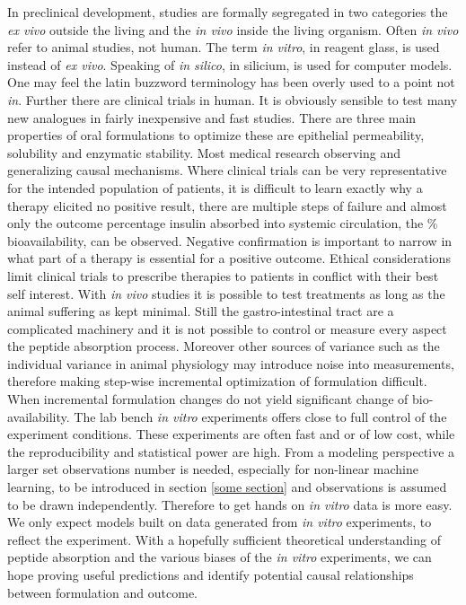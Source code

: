 In preclinical development, studies are formally segregated in two categories the \textit{ex vivo} outside the living and the \textit{in vivo} inside the living organism. Often \textit{in vivo} refer to animal studies, not human. The term \textit{in vitro}, in reagent glass, is used instead of \textit{ex vivo}. Speaking of \textit{in silico}, in silicium, is used for computer models. One may feel the latin buzzword terminology has been overly used to a point not \textit{in}. Further there are clinical trials in human. It is obviously sensible to test many new analogues in fairly inexpensive and fast studies. There are three main properties of oral formulations to optimize these are epithelial permeability, solubility and enzymatic stability. Most medical research observing and generalizing causal mechanisms. Where clinical trials can be very representative for the intended population of patients, it is difficult to learn exactly why a therapy elicited no positive result, there are multiple steps of failure and almost only the outcome percentage insulin absorbed into systemic circulation, the \% bioavailability, can be observed. Negative confirmation is important to narrow in what part of a therapy is essential for a positive outcome. Ethical considerations limit clinical trials to prescribe therapies to patients in conflict with their best self interest. With \textit{in vivo} studies it is possible to test treatments as long as the animal suffering as kept minimal. Still the gastro-intestinal tract are a complicated machinery and it is not possible to control or measure every aspect the peptide absorption process. Moreover other sources of variance such as the individual variance in animal physiology may introduce noise into measurements, therefore making step-wise incremental optimization of formulation difficult. When incremental formulation changes do not yield significant change of bio-availability. The lab bench \textit{in vitro} experiments offers close to full control of the experiment conditions. These experiments are often fast and or of low cost, while the reproducibility and statistical power are high. From a modeling perspective a larger set observations number is needed, especially for non-linear machine learning, to be introduced in section \ref{some section} and observations is assumed to be drawn independently. Therefore to get hands on \textit{in vitro} data is more easy. We only expect models built on data generated from \textit{in vitro} experiments, to reflect the   experiment. With a hopefully sufficient theoretical understanding of peptide absorption and the various biases of the \textit{in vitro} experiments, we can hope proving useful predictions and identify potential causal relationships between formulation and outcome.

